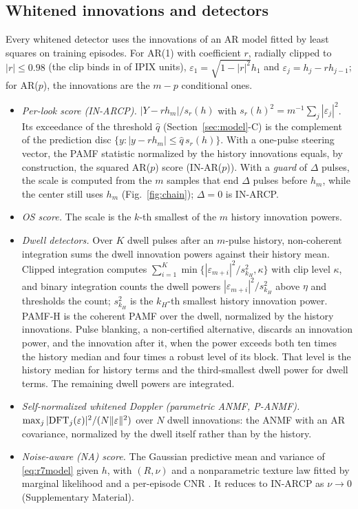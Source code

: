 \documentclass[journal]{IEEEtran}
\begin{document}
\subsection{Whitened innovations and detectors}
Every whitened detector uses the innovations of an AR model fitted by least squares on training episodes. For AR(1) with coefficient $r$, radially clipped to $|r|\le0.98$ (the clip binds in \FitClampBinding{} of \NUnitsConf{} IPIX units), $\varepsilon_1=\sqrt{1-|r|^2}h_1$ and $\varepsilon_j=h_j-rh_{j-1}$; for AR($p$), the innovations are the $m-p$ conditional ones.
\begin{itemize}[leftmargin=*,itemsep=1pt]
\item \emph{Per-look score (IN-ARCP).} $|Y-rh_m|/s_r(h)$ with $s_r(h)^2=m^{-1}\sum_j|\varepsilon_j|^2$. Its exceedance of the threshold $\widehat q$ (Section~\ref{sec:model}-C) is the complement of the prediction disc $\{y:|y-rh_m|\le\widehat q\,s_r(h)\}$. With a one-pulse steering vector, the PAMF statistic normalized by the history innovations equals, by construction, the squared AR($p$) score (IN-AR($p$)). With a \emph{guard} of $\Delta$ pulses, the scale is computed from the $m$ samples that end $\Delta$ pulses before $h_m$, while the center still uses $h_m$ (Fig.~\ref{fig:chain}); $\Delta=0$ is IN-ARCP.
\item \emph{OS score.} The scale is the $k$-th smallest of the $m$ history innovation powers.
\item \emph{Dwell detectors.} Over $K$ dwell pulses after an $m$-pulse history, non-coherent integration sums the dwell innovation powers against their history mean. Clipped integration computes $\sum_{i=1}^K\min\{|\varepsilon_{m+i}|^2/s_{k_H}^2,\kappa\}$ with clip level $\kappa$, and binary integration counts the dwell powers $|\varepsilon_{m+i}|^2/s_{k_H}^2$ above $\eta$ and thresholds the count; $s_{k_H}^2$ is the $k_H$-th smallest history innovation power. PAMF-H is the coherent PAMF over the dwell, normalized by the history innovations. Pulse blanking, a non-certified alternative, discards an innovation power, and the innovation after it, when the power exceeds both ten times the history median and four times a robust level of its block. That level is the history median for history terms and the third-smallest dwell power for dwell terms. The remaining dwell powers are integrated.
\item \emph{Self-normalized whitened Doppler (parametric ANMF, P-ANMF).} $\max_j|{\rm DFT}_j(\varepsilon)|^2/(N\|\varepsilon\|^2)$ over $N$ dwell innovations: the ANMF with an AR covariance, normalized by the dwell itself rather than by the history.
\item \emph{Noise-aware (NA) score.} The Gaussian predictive mean and variance of \eqref{eq:r7model} given $h$, with $(R,\nu)$ and a nonparametric texture law fitted by marginal likelihood and a per-episode CNR \cite{ignatiadis2025}. It reduces to IN-ARCP as $\nu\to0$ (Supplementary Material).
\end{itemize}
\end{document}
